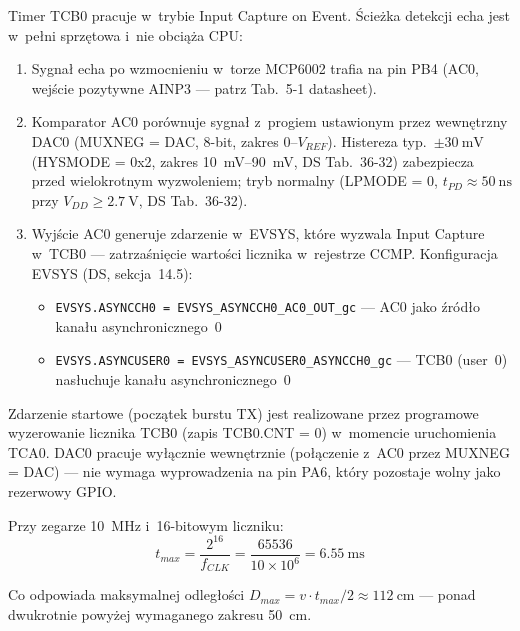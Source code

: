 \documentclass[a4paper,11pt]{article}
\begin{document}
Timer TCB0 pracuje w~trybie Input Capture on Event. Ścieżka detekcji
echa jest w~pełni sprzętowa i~nie obciąża CPU:

\begin{enumerate}[nosep]
    \item Sygnał echa po wzmocnieniu w~torze MCP6002 trafia
          na pin PB4 (AC0, wejście pozytywne AINP3 --- patrz Tab.~5-1 datasheet).
    \item Komparator AC0 porównuje sygnał z~progiem ustawionym przez
          wewnętrzny DAC0 (MUXNEG = DAC, 8-bit, zakres 0--$V_{REF}$).
          Histereza typ.\ $\pm\SI{30}{\milli\volt}$ (HYSMODE = 0x2,
          zakres \SIrange{10}{90}{\milli\volt}, DS Tab.~36-32) zabezpiecza
          przed wielokrotnym wyzwoleniem; tryb normalny (LPMODE = 0,
          $t_{PD} \approx \SI{50}{\nano\second}$ przy $V_{DD} \geq \SI{2,7}{\volt}$,
          DS Tab.~36-32).
    \item Wyjście AC0 generuje zdarzenie w~EVSYS, które
          wyzwala Input Capture w~TCB0 --- zatrzaśnięcie wartości licznika
          w~rejestrze CCMP. Konfiguracja EVSYS (DS, sekcja~14.5):
          \begin{itemize}[nosep]
              \item \texttt{EVSYS.ASYNCCH0 = EVSYS\_ASYNCCH0\_AC0\_OUT\_gc}
                    --- AC0 jako źródło kanału asynchronicznego~0
              \item \texttt{EVSYS.ASYNCUSER0 = EVSYS\_ASYNCUSER0\_ASYNCCH0\_gc}
                    --- TCB0 (user~0) nasłuchuje kanału asynchronicznego~0
          \end{itemize}
\end{enumerate}

Zdarzenie startowe (początek burstu TX) jest realizowane przez programowe
wyzerowanie licznika TCB0 (zapis TCB0.CNT = 0) w~momencie uruchomienia
TCA0. DAC0 pracuje wyłącznie wewnętrznie (połączenie z~AC0 przez
MUXNEG = DAC) --- nie wymaga wyprowadzenia na pin PA6, który pozostaje
wolny jako rezerwowy GPIO.

Przy zegarze \SI{10}{\mega\hertz} i~16-bitowym liczniku:
\begin{equation}
    t_{max} = \frac{2^{16}}{f_{CLK}} = \frac{65536}{10 \times 10^6} = \SI{6,55}{\milli\second}
    \label{eq:tcb_max}
\end{equation}

Co odpowiada maksymalnej odległości $D_{max} = v \cdot t_{max} / 2 \approx
\SI{112}{\centi\metre}$ --- ponad dwukrotnie powyżej wymaganego zakresu \SI{50}{\centi\metre}.
\end{document}

